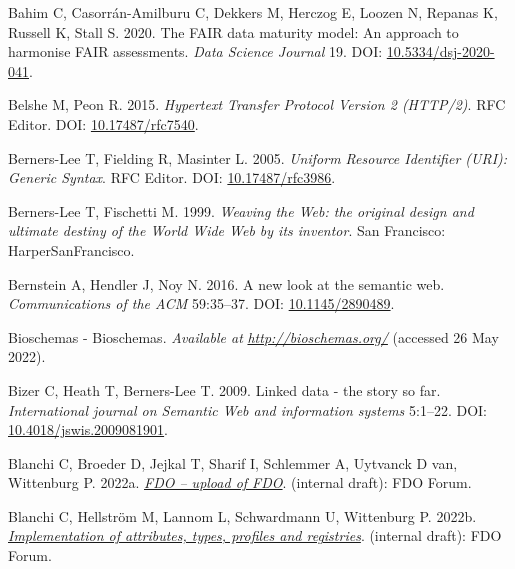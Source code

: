 \begin{CSLReferences}{1}{0}
\leavevmode{}%
Bahim C, Casorrán-Amilburu C, Dekkers M, Herczog E, Loozen N, Repanas K, Russell K, Stall S. 2020. The FAIR data maturity model: An approach to harmonise FAIR assessments. \emph{Data Science Journal} 19. DOI: \href{https://doi.org/10.5334/dsj-2020-041}{10.5334/dsj-2020-041}.

\leavevmode{}%
Belshe M, Peon R. 2015. \emph{Hypertext Transfer Protocol Version 2 (HTTP/2)}. RFC Editor. DOI: \href{https://doi.org/10.17487/rfc7540}{10.17487/rfc7540}.

\leavevmode{}%
Berners-Lee T, Fielding R, Masinter L. 2005. \emph{Uniform Resource Identifier (URI): Generic Syntax}. RFC Editor. DOI: \href{https://doi.org/10.17487/rfc3986}{10.17487/rfc3986}.

\leavevmode{}%
Berners-Lee T, Fischetti M. 1999. \emph{Weaving the Web: the original design and ultimate destiny of the World Wide Web by its inventor}. San Francisco: HarperSanFrancisco.

\leavevmode{}%
Bernstein A, Hendler J, Noy N. 2016. A new look at the semantic web. \emph{Communications of the ACM} 59:35--37. DOI: \href{https://doi.org/10.1145/2890489}{10.1145/2890489}.

\leavevmode{}%
Bioschemas - Bioschemas. \emph{Available at} \href{http://bioschemas.org/}{\emph{http://bioschemas.org/}} (accessed 26 May 2022).

\leavevmode{}%
Bizer C, Heath T, Berners-Lee T. 2009. Linked data - the story so far. \emph{International journal on Semantic Web and information systems} 5:1--22. DOI: \href{https://doi.org/10.4018/jswis.2009081901}{10.4018/jswis.2009081901}.

\leavevmode{}%
Blanchi C, Broeder D, Jejkal T, Sharif I, Schlemmer A, Uytvanck D van, Wittenburg P. 2022a. \emph{\href{https://docs.google.com/document/d/1fDR5VHbVIa2AbLsBR58idrfn_Ib3x6Fk-_LJ4c_Ftt4/edit}{FDO -- upload of FDO}}. (internal draft): FDO Forum.

\leavevmode{}%
Blanchi C, Hellström M, Lannom L, Schwardmann U, Wittenburg P. 2022b. \emph{\href{https://docs.google.com/document/d/1RrOiwMhkl-hRzWmlluA2iXCzHK-bj7_80LlMXgWx4w4/edit}{Implementation of attributes, types, profiles and registries}}. (internal draft): FDO Forum.


\end{CSLReferences}
